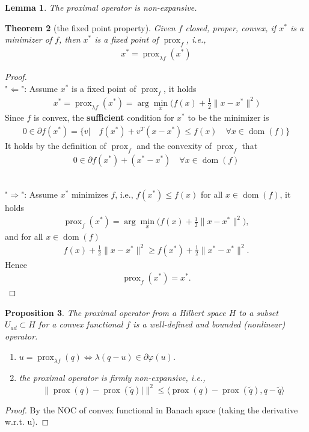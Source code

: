 \documentclass[a4paper,11pt,fleqn, draft]{book}
\newtheorem{theorem}{Theorem}[section]
\newtheorem{lemma}[theorem]{Lemma}
\newtheorem{proposition}[theorem]{Proposition}
\theoremstyle{definition}
\theoremstyle{remark}
\DeclareMathOperator{\dom}{dom}
\DeclareMathOperator*{\prox}{prox}
\begin{document}
\begin{lemma}
	The proximal operator is non-expansive. 
\end{lemma}

\begin{theorem}[the fixed point property]
	Given $f$ closed, proper, convex, if $x^*$ is a minimizer of $f$, then $x^*$ is a fixed point of $\prox_f$, i.e., 
	\begin{align*}
		x^* = \prox\nolimits_{\lambda f}(x^*)
	\end{align*}
\end{theorem}
\begin{proof}
\quad\\
"$\Leftarrow$": Assume $x^*$ is a fixed point of $\prox_f$, it holds
\begin{align*}
	x^* = \prox\nolimits_{\lambda f}(x^*) = \arg\min_x \bigg( f(x) + \frac{1}{2}\|x - x^*\|^2 \bigg)
\end{align*}
Since $f$ is convex, the \textbf{sufficient} condition for $x^*$ to be the minimizer is 
\begin{align*}
	0 \in \partial f(x^*) = \{ v |\quad f(x^*) + v^T(x - x^*) \le f(x) \quad\forall x \in \dom (f) \}
\end{align*}
It holds by the definition of $\prox_f$ and the convexity of $\prox_f$ that
\begin{align*}
	0 \in \partial f(x^*) + (x^* - x^*) \quad \forall x \in \dom (f)
\end{align*}

\quad\\
	"$\Rightarrow$": Assume $x^*$ minimizes $f$, i.e., $f(x^*) \le f(x)$ for all $x \in \dom(f)$, it holds
	\begin{align*}
		\prox_f(x^*) = \arg\min_x \bigg( f(x) + \frac{1}{2} \|x - x^*\|^2 \bigg),
	\end{align*}
	and for all $x \in \dom(f)$
	\begin{align*}
		f(x) + \frac{1}{2}\|x - x^*\|^2 \ge f(x^*) + \frac{1}{2}\|x^* - x^*\|^2.
	\end{align*}
	Hence 
	\begin{align*}
		\prox_f(x^*) = x^*. 
	\end{align*}
\end{proof}

\begin{proposition}
    The proximal operator from a Hilbert space $H$ to a subset $U_{ad} \subset H$ for a convex functional $f$ is a well-defined and bounded (nonlinear) operator. 
	\begin{enumerate}
		\item $u = \prox\nolimits_{\lambda f}(q) \Leftrightarrow \lambda(q - u) \in \partial\varphi(u)$. 
        \item the proximal operator is firmly non-expansive, i.e., 
        $$
           \| \prox (q) - \prox(\tilde{q})|\|^2 \le \langle \prox (q) - \prox(\tilde{q}), q - \tilde{q}\rangle
        $$
	\end{enumerate}
\end{proposition}
\begin{proof}
    By the NOC of convex functional in Banach space (taking the derivative w.r.t. u). 
\end{proof}
\end{document}
